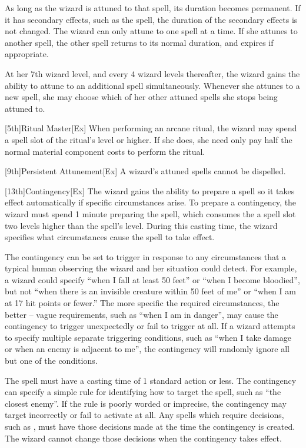         As long as the wizard is attuned to that spell, its duration becomes permanent.
        If it has secondary effects, such as the  spell, the duration of the secondary effects is not changed.
        The wizard can only attune to one spell at a time.
        If she attunes to another spell, the other spell returns to its normal duration, and expires if appropriate.

        At her 7th wizard level, and every 4 wizard levels thereafter, the wizard gains the ability to attune to an additional spell simultaneously.
        Whenever she attunes to a new spell, she may choose which of her other attuned spells she stops being attuned to.

        [5th]{Ritual Master}[Ex]
        When performing an arcane ritual, the wizard may spend a spell slot of the ritual's level or higher.
        If she does, she need only pay half the normal material component costs to perform the ritual.

        [9th]{Persistent Attunement}[Ex]
        A wizard's attuned spells cannot be dispelled.

        [13th]{Contingency}[Ex]
        The wizard gains the ability to prepare a spell so it takes effect automatically if specific circumstances arise.
        To prepare a contingency, the wizard must spend 1 minute preparing the spell, which consumes the a spell slot two levels higher than the spell's level.
        During this casting time, the wizard specifies what circumstances cause the spell to take effect.

        The contingency can be set to trigger in response to any circumstances that a typical human observing the wizard and her situation could detect.
        For example, a wizard could specify ``when I fall at least 50 feet'' or ``when I become bloodied'', but not ``when there is an invisible creature within 50 feet of me'' or ``when I am at 17 hit points or fewer.'' The more specific the required circumstances, the better -- vague requirements, such as ``when I am in danger'', may cause the contingency to trigger unexpectedly or fail to trigger at all.
        If a wizard attempts to specify multiple separate triggering conditions, such as ``when I take damage or when an enemy is adjacent to me'', the contingency will randomly ignore all but one of the conditions.

        The spell must have a casting time of 1 standard action or less.
        The contingency can specify a simple rule for identifying how to target the spell, such as ``the closest enemy''.
        If the rule is poorly worded or imprecise, the contingency may target incorrectly or fail to activate at all.
        Any spells which require decisions, such as , must have those decisions made at the time the contingency is created.
        The wizard cannot change those decisions when the contingency takes effect.


